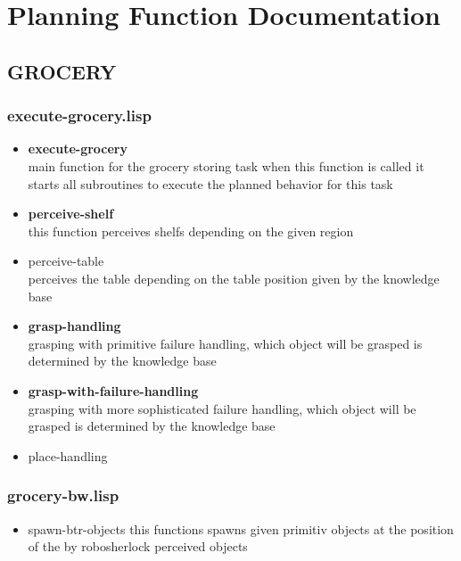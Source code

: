 \documentclass[main.tex]{subfiles}
\begin{document}
	\begingroup

	\renewcommand{\cleardoublepage}{}

	\renewcommand{\clearpage}{}

	\chapter{Planning Function Documentation}

		\chapterauthor{}
		
		\section{GROCERY}
		
		\subsection{execute-grocery.lisp}
		
		\begin{itemize}
			\item \textbf{execute-grocery} \\
			main function for the grocery storing task when this function is called it starts all subroutines to execute the planned behavior for this task
			\item \textbf{perceive-shelf} \\
			this function perceives shelfs depending on the given region
			\item perceive-table \\
			perceives the table depending on the table position given by the knowledge base
			\item \textbf{grasp-handling} \\
			grasping with primitive failure handling, which object will be grasped is determined by the knowledge base
			\item \textbf{grasp-with-failure-handling} \\
			grasping with more sophisticated failure handling, which object will be grasped is determined by the knowledge base
			\item place-handling
		\end{itemize}
		
		\subsection{grocery-bw.lisp}
		
		\begin{itemize}
			\item spawn-btr-objects
			this functions spawns given primitiv objects at the position of the by robosherlock perceived objects 
		\end{itemize}
	  	
\end{document}
